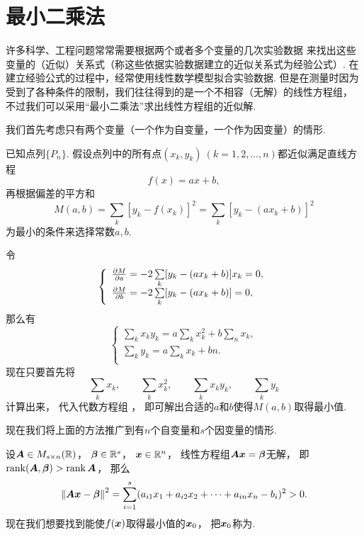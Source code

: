 \section{最小二乘法}
许多科学、工程问题常常需要根据两个或者多个变量的几次实验数据
来找出这些变量的（近似）关系式（称这些依据实验数据建立的近似关系式为经验公式）.
在建立经验公式的过程中，经常使用线性数学模型拟合实验数据.
但是在测量时因为受到了各种条件的限制，我们往往得到的是一个不相容（无解）的线性方程组，
不过我们可以采用“最小二乘法”求出线性方程组的近似解.

我们首先考虑只有两个变量（一个作为自变量，一个作为因变量）的情形.

已知点列\(\{P_n\}\).
假设点列中的所有点\((x_k,y_k)\ (k=1,2,\dotsc,n)\)都近似满足直线方程\[
	f(x) = a x + b,
\]
再根据偏差的平方和\[
	M(a,b) = \sum\limits_k [y_k - f(x_k)]^2 = \sum\limits_k [y_k - (a x_k + b)]^2
\]为最小的条件来选择常数\(a,b\).

令\[
	\left\{ \begin{array}{l}
		\pdv{M}{a} = -2 \sum\limits_k [y_k - (a x_k + b)] x_k = 0, \\
		\pdv{M}{b} = -2 \sum\limits_k [y_k - (a x_k + b)] = 0,
	\end{array} \right.
\]
那么有\begin{equation}\label{equation:最小二乘法.关于a和b的代数方程组}
	\left\{ \begin{array}{l}
		\sum\limits_k x_k y_k = a \sum\limits_k x_k^2 + b \sum\limits_n x_k, \\
		\sum\limits_k y_k = a \sum\limits_k x_k + b n. \\
	\end{array} \right.
\end{equation}
现在只要首先将\[
	\sum\limits_k x_k, \qquad
	\sum\limits_k x_k^2, \qquad
	\sum\limits_k x_k y_k, \qquad
	\sum\limits_k y_k
\]计算出来，
代入代数方程组 ，
即可解出合适的\(a\)和\(b\)使得\(M(a,b)\)取得最小值.

现在我们将上面的方法推广到有\(n\)个自变量和\(s\)个因变量的情形.

设\(\boldsymbol{A} \in M_{s \times n}(\mathbb{R})\)，
\(\boldsymbol{\beta} \in \mathbb{R}^s\)，
\(\boldsymbol{x} \in \mathbb{R}^n\)，
线性方程组\(\boldsymbol{A}\boldsymbol{x}=\boldsymbol{\beta}\)无解，
即\(\rank(\boldsymbol{A},\boldsymbol{\beta})>\rank\boldsymbol{A}\)，
那么\[
	\norm{\boldsymbol{A}\boldsymbol{x}-\boldsymbol{\beta}}^2
	= \sum\limits_{i=1}^s (a_{i1} x_1 + a_{i2} x_2 + \dotsb + a_{in} x_n - b_i)^2
	> 0.
\]
现在我们想要找到能使\(f(\boldsymbol{x})\)取得最小值的\(\boldsymbol{x}_0\)，
把\(\boldsymbol{x}_0\)称为.

\endgroup
